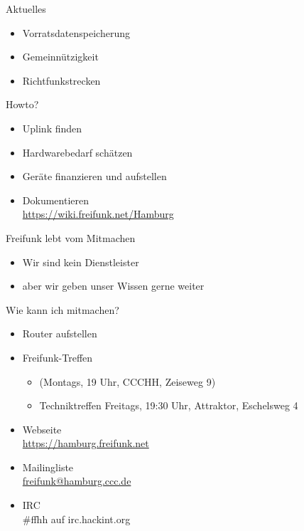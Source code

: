 \documentclass[t]{beamer}
\begin{document}
  
  \begin{frame}{Aktuelles}
    \begin{itemize}
      \item Vorratsdatenspeicherung
      \item Gemeinnützigkeit
      \item Richtfunkstrecken
    \end{itemize}
  \end{frame}
    
  
  \begin{frame}{Howto?}
    \begin{itemize}
      \item Uplink finden
      \item Hardwarebedarf schätzen
      \item Geräte finanzieren und aufstellen
      \item Dokumentieren\\
      \small{ \href{https://wiki.freifunk.net/Hamburg}{https://wiki.freifunk.net/Hamburg}}
    \end{itemize}
  \end{frame}
  
  \begin{frame}{Freifunk lebt vom Mitmachen}
    \begin{itemize}
      \item Wir sind kein Dienstleister
      \item aber wir geben unser Wissen gerne weiter
    \end{itemize}
  \end{frame}
  
  \begin{frame}{Wie kann ich mitmachen?}
    \begin{itemize}
      \item Router aufstellen
      \item Freifunk-Treffen
      \begin{itemize}
       \item (Montags, 19 Uhr, CCCHH, Zeiseweg 9)
       \item Techniktreffen Freitags, 19:30 Uhr, Attraktor, Eschelsweg 4
      \end{itemize}
      \item Webseite\\
      \href{https://hamburg.freifunk.net}{\small https://hamburg.freifunk.net}
      \item Mailingliste\\
      \href{mailto:freifunk@hamburg.ccc.de}{\small freifunk@hamburg.ccc.de}
      \item IRC\\
      \small{\#ffhh auf irc.hackint.org}
    \end{itemize}
  \end{frame}
  
\end{document}
